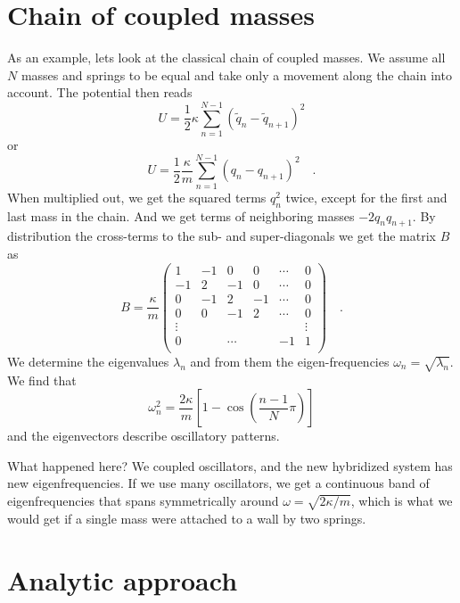 \section{Chain of coupled masses}

As an example, lets look at the classical chain of coupled masses. We assume all $N$ masses and springs to be equal and take only a movement along the chain into account. The potential then reads
\begin{equation}
    U = \frac{1}{2} \kappa \sum_{n=1}^{N-1} ( \tilde{q}_n - \tilde{q}_{n+1} )^2
\end{equation}
or
\begin{equation}
U = \frac{1}{2} \frac{\kappa}{m} \sum_{n=1}^{N-1}  ( q_n - q_{n+1} )^2 \quad .
\end{equation}
When multiplied out, we get the squared terms $q_n^2$ twice, except for the first and last mass in the chain. And we get terms of neighboring masses $- 2 q_n q_{n+1}$. 
By distribution the cross-terms to the sub- and super-diagonals we get the matrix $B$ as 
\begin{equation}
B =\frac{\kappa}{m} \begin{pmatrix}
 1 & -1 & 0 &  0 & \cdots & 0 \\
-1 & 2 & -1 &  0 & \cdots & 0 \\
0  & -1 & 2 &  -1 & \cdots & 0 \\
0 & 0  & -1 & 2 &   \cdots & 0 \\
\vdots  & & &  &  & \vdots \\
0 &   & \cdots    &    & -1 & 1 \\
\end{pmatrix} \quad .
\end{equation}
We determine the eigenvalues $\lambda_n$ and from them the eigen-frequencies $\omega_n = \sqrt{\lambda_n}$. We find that
\begin{equation}
  \omega_n^2 = \frac{2 \kappa}{m} \left[ 1 - \cos \left(\frac{n-1}{N} \pi \right) \right] 
  \label{eq:5_omega_diag}
\end{equation}
and the eigenvectors describe oscillatory patterns.


What happened here? We coupled oscillators, and the new hybridized system has new eigenfrequencies. If we use many oscillators, we get a continuous band of eigenfrequencies that spans symmetrically around $\omega = \sqrt{2 \kappa / m}$, which is what we would get if a single mass were attached to a wall by two springs.


\section{Analytic approach}

